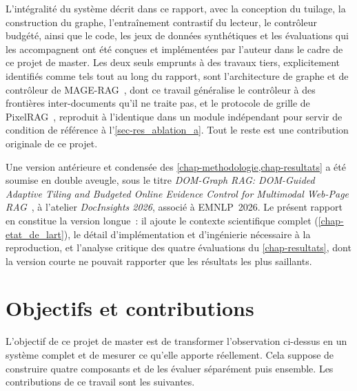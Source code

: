 L'intégralité du système décrit dans ce rapport, avec la conception du tuilage,
la construction du graphe, l'entraînement contrastif du lecteur, le contrôleur
budgété, ainsi que le code, les jeux de données synthétiques et les
évaluations qui les accompagnent ont été conçues et implémentées par l'auteur
dans le cadre de ce projet de master. Les deux seuls emprunts à des travaux
tiers, explicitement identifiés comme tels tout au long du rapport, sont
l'architecture de graphe et de contrôleur de MAGE-RAG~\citep{magerag2026},
dont ce travail généralise le contrôleur à des frontières inter-documents
qu'il ne traite pas, et le protocole de grille de PixelRAG~\citep{pixelrag2026},
reproduit à l'identique dans un module indépendant pour servir de condition de
référence à l'\cref{sec-res_ablation_a}. Tout le reste est une contribution
originale de ce projet.

Une version antérieure et condensée des \cref{chap-methodologie,chap-resultats}
a été soumise en double aveugle, sous le titre \emph{\og DOM-Graph RAG:
DOM-Guided Adaptive Tiling and Budgeted Online Evidence Control for
Multimodal Web-Page RAG\fg{}}~\citep{domgraphrag2026}, à l'atelier
\emph{DocInsights 2026}, associé à EMNLP~2026. Le présent rapport en constitue
la version longue~: il ajoute le contexte scientifique complet
(\cref{chap-etat_de_lart}), le détail d'implémentation et d'ingénierie
nécessaire à la reproduction, et l'analyse critique
des quatre évaluations du \cref{chap-resultats}, dont la version courte ne
pouvait rapporter que les résultats les plus saillants.

\section*{Objectifs et contributions}

L'objectif de ce projet de master est de transformer l'observation ci-dessus en
un système complet et de mesurer ce qu'elle apporte réellement. Cela suppose de construire quatre composants et de
les évaluer séparément puis ensemble. Les contributions de ce travail sont les
suivantes.

